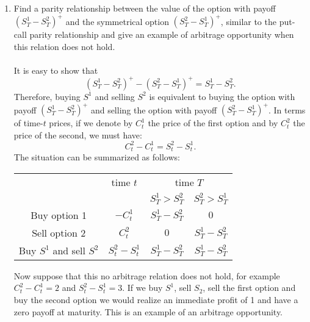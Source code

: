 \documentclass[11pt,a4,table]{article}
\begin{document}
\begin{enumerate}
\begin{enumerate}
        \item Find a parity relationship between the value of the option with payoff $(S_T^1-S_T^2)^+$ and the symmetrical option $(S_T^2-S_T^1)^+$, similar to the put-call parity relationship and give an example of arbitrage opportunity when this relation does not hold.\\\\
        It is easy to show that
        \begin{equation*}
            (S_T^1-S_T^2)^+ - (S_T^2-S_T^1)^+ = S_T^1 - S_T^2.
        \end{equation*}
        Therefore, buying $S^1$ and selling $S^2$ is equivalent to buying the option with payoff $(S_T^1 - S_T^2)^+$ and selling the option with payoff $(S_T^2 - S_T^1)^+$. In terms of time-$t$ prices, if we denote by $C_t^1$ the price of the first option and by $C_t^2$ the price of the second, we must have:
        \begin{equation*}
            C_t^2 - C_t^1 = S_t^2 - S_t^1.
        \end{equation*}
        The situation can be summarized as follows:
        \begin{center}
            \begin{tabular}{c | c c c}
            \hline \hline
                   &  time $t$  & \multicolumn{2}{c}{\multirow{1}{*}{time $T$}}  \\
                   & & $S_T^1>S_T^2$ & $S_T^2>S_T^1$\\
            \hline
            Buy option 1   &  $-C_t^1$ & $S_T^1-S_T^2$   & $0$     \\
            Sell option 2  &  $C_t^2$ & $0$  & $S_T^1-S_T^2$    \\
            \hline
            Buy $S^1$ and sell $S^2$ & $S_t^2 - S_t^1$ & $S_T^1-S_T^2$ & $S_T^1-S_T^2$\\
            \hline \hline
            \end{tabular}
        \end{center}
        
        Now suppose that this no arbitrage relation does not hold, for example $C_t^2-C_t^1 = 2$ and $S_t^2-S_t^1  = 3$. If we buy $S^1$, sell $S_2$, sell the first option and buy the second option we would realize an immediate profit of 1 and have a zero payoff at maturity. This is an example of an arbitrage opportunity.
        

\end{enumerate}
\end{enumerate}
\end{document}
